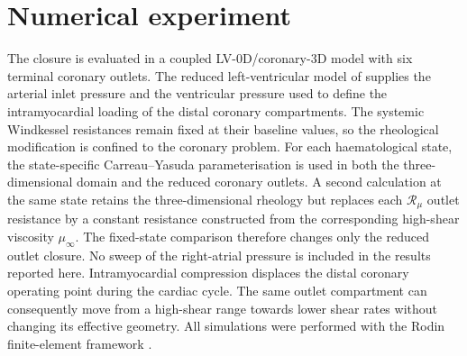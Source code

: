 \documentclass[lineno]{jfm}
\begin{document}
\section{Numerical experiment}
\label{sec:applications}
The closure is evaluated in a coupled LV-0D/coronary-3D model with six
terminal coronary outlets. The reduced left-ventricular model of
\citet{caruel2014dimensional} supplies the arterial inlet pressure and the
ventricular pressure used to define the intramyocardial loading of the distal
coronary compartments. The systemic Windkessel resistances remain fixed at
their baseline values, so the rheological modification is confined to the
coronary problem.
For each haematological state, the state-specific Carreau--Yasuda
parameterisation is used in both the three-dimensional domain and the reduced
coronary outlets. A second calculation at the same state retains the
three-dimensional rheology but replaces each $\mathcal{R}_{\mu}$ outlet
resistance by a constant resistance constructed from the corresponding
high-shear viscosity $\mu_\infty$. The fixed-state comparison therefore changes
only the reduced outlet closure. No sweep of the right-atrial pressure is
included in the results reported here.
Intramyocardial compression displaces the distal coronary operating point
during the cardiac cycle. The same outlet compartment can consequently move
from a high-shear range towards lower shear rates without changing its
effective geometry. All simulations were performed with the Rodin
finite-element framework \citep{Brito-Pacheco_Rodin_2023}.
\end{document}
